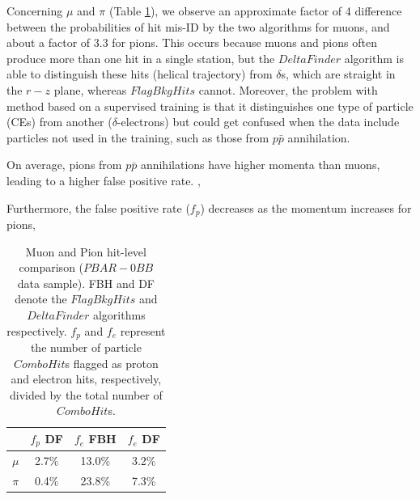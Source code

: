       
      Concerning $\mu$ and $\pi$ (Table \ref{tab:0bbpbar}), 
      we observe an approximate factor of 
      4 difference between the probabilities of hit mis-ID by the two algorithms 
      for muons, and about a factor 
      of 3.3 for pions. This occurs because 
      muons and pions often produce more than one 
      hit in a single station, but the 
      $DeltaFinder$ algorithm is able to 
      distinguish these hits (helical 
      trajectory) from $\delta$s, which are 
      straight in the $r-z$ plane, whereas 
      $FlagBkgHits$ cannot. Moreover, the 
      problem with method based on a supervised 
      training is that it distinguishes 
      one type of particle (CEs) from 
      another ($\delta$-electrons) but could get confused when 
      the data include particles not used in the training, such as 
      those from $p\bar{p}$ annihilation. 
      
      On average, pions from $p\bar{p}$ annihilations  
      have higher momenta than muons, leading to a 
      higher false positive rate. ,


    Furthermore, 
      the false positive rate ($f_p$) decreases 
      as the momentum increases for pions, 

    \begin{center}
        \begin{table}[h!]
        \centering
        \renewcommand{\arraystretch}{1.}
        \begin{tabular}{| c | c | c | c|} 
        \hline
         &  $f_{p}$ DF &  $f_{e}$ FBH & $f_{e}$ DF\\
        \hline
        $\mu$  &  2.7\%  & 13.0\% & 3.2\%\\
        \hline
        $\pi$ & 0.4\% & 23.8\%& 7.3\%\\
        \hline
        \end{tabular}
        \caption{Muon and Pion 
        hit-level comparison ($PBAR-0BB$ data sample). FBH and DF denote 
        the $FlagBkgHits$ and $DeltaFinder$ algorithms respectively. $f_p$ and $f_e$ represent 
        the number of particle $ComboHit$s flagged as proton and electron hits, respectively, 
        divided by the total number of $ComboHit$s.}
        \label{tab:0bbpbar}
        \end{table}
        \end{center}

